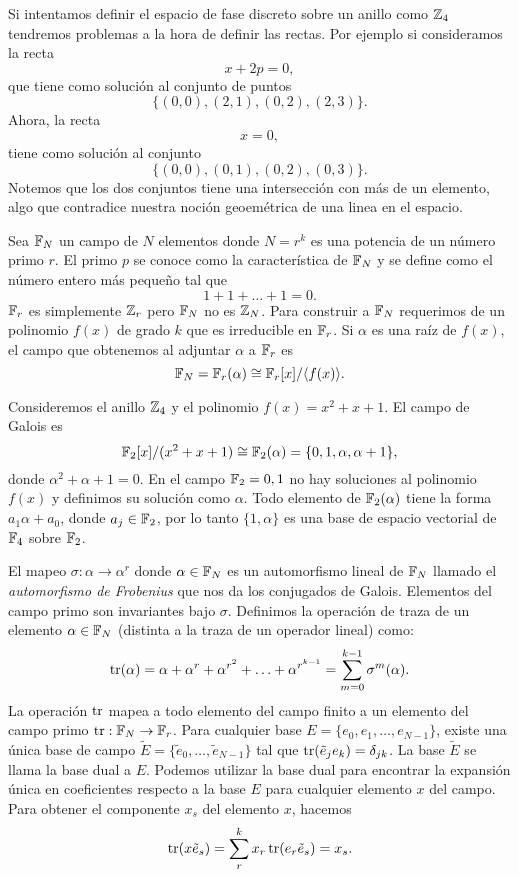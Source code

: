   Si intentamos definir el espacio de fase discreto sobre un
  anillo como $\operatorname{\mathbb{Z}}_4$ tendremos problemas a la hora de
  definir las rectas. Por ejemplo si consideramos la recta
  \[
    x + 2p = 0,
  \]
  que tiene como solución al conjunto de puntos
  \[
    \{(0,0), (2,1), (0,2), (2,3)\}.
  \] 
  Ahora, la recta 
  \[
    x = 0,
  \] 
  tiene como solución al conjunto
  \[
    \{(0,0), (0,1), (0,2), (0,3)\}.
  \] 
  Notemos que los dos conjuntos tiene una intersección con
  más de un elemento, algo que contradice nuestra noción
  geoemétrica de una linea en el espacio.

  Sea $\operatorname{\mathbb{F}}_N$ un campo de $N$ elementos donde $N = r^{k}$ es
  una potencia de un número primo $r$. El primo $p$ se
  conoce como la característica de $\operatorname{\mathbb{F}}_N$ y se define como
  el número entero más pequeño tal que
  \[
    1 + 1 + \ldots + 1 = 0.
  \] 
  $\operatorname{\mathbb{F}}_r$ es simplemente $\operatorname{\mathbb{Z}}_r$ pero $\operatorname{\mathbb{F}}_N$ no es $\operatorname{\mathbb{Z}}_N$.
  Para construir a $\operatorname{\mathbb{F}}_N$ requerimos de un polinomio $f(x)$ 
  de grado $k$ que es irreducible en $\operatorname{\mathbb{F}}_r$. Si $\alpha$ es
  una raíz de $f(x)$, el campo que obtenemos al adjuntar
  $\alpha$ a $\operatorname{\mathbb{F}}_r$ es
  \[
    \operatorname{\mathbb{F}}_N
    = \operatorname{\mathbb{F}}_r(\alpha) \cong \operatorname{\mathbb{F}}_r[x] / \langle f(x) \rangle.
  \] 
  \begin{example}
    Consideremos el anillo $\operatorname{\mathbb{Z}}_4$ y el polinomio $f(x) = x^2
    + x + 1$. El campo de Galois es
    \[
      \operatorname{\mathbb{F}}_2[x] / (x^2 + x + 1)
      \cong \operatorname{\mathbb{F}}_2(\alpha)
      = \{0, 1, \alpha, \alpha + 1\},
    \] 
    donde $\alpha^2 + \alpha + 1 = 0$. En el campo $\operatorname{\mathbb{F}}_2 =
    {0,1}$ no hay soluciones al polinomio $f(x)$ y definimos
    su solución como $\alpha$. Todo elemento de
    $\operatorname{\mathbb{F}}_2(\alpha)$ tiene la forma $a_1 \alpha + a_0$, donde
    $a_j \in \operatorname{\mathbb{F}}_2$, por lo tanto $\{1, \alpha\}$ es una base
    de espacio vectorial de $\operatorname{\mathbb{F}}_4$ sobre $\operatorname{\mathbb{F}}_2$.
  \end{example}

  El mapeo $\sigma : \alpha \to \alpha^r$ donde $\alpha \in
  \operatorname{\mathbb{F}}_N$ es un automorfismo lineal de $\operatorname{\mathbb{F}}_N$ llamado el
  \textit{automorfismo de Frobenius} que nos da los
  conjugados de Galois. Elementos del campo primo son
  invariantes bajo $\sigma$. Definimos la operación de traza
  de un elemento $\alpha \in \operatorname{\mathbb{F}}_N$ (distinta a la traza de
  un operador lineal) como:
  \[
    \operatorname{tr}(\alpha) 
    = \alpha + \alpha^{r} + \alpha^{r^2} + \ldots +
    \alpha^{r^{k-1}}
    = \sum_{m=0}^{k-1} \sigma^{m}(\alpha).
  \] 
  La operación $\operatorname{tr}$ mapea a todo elemento del campo finito
  a un elemento del campo primo $\operatorname{tr} : \operatorname{\mathbb{F}}_N \to \operatorname{\mathbb{F}}_r$. Para
  cualquier base $E = \{e_0,e_1,\ldots,e_{N-1}\}$, existe
  una única base de campo $\tilde E = \{\tilde
  e_0,\ldots,\tilde e_{N-1}\}$ tal que $\operatorname{tr}(\tilde e_j e_k)
  = \delta_{jk}$. La base $\tilde E$ se llama la base dual a
  $E$. Podemos utilizar la base dual para encontrar la
  expansión única en coeficientes respecto a la base $E$ 
  para cualquier elemento $x$ del campo. Para obtener el
  componente $x_s$ del elemento $x$, hacemos
  \[
    \operatorname{tr}(x \tilde e_s)
    = \sum_{r}^{k} x_r \operatorname{tr}(e_r \tilde e_s)
    = x_s.
  \]

